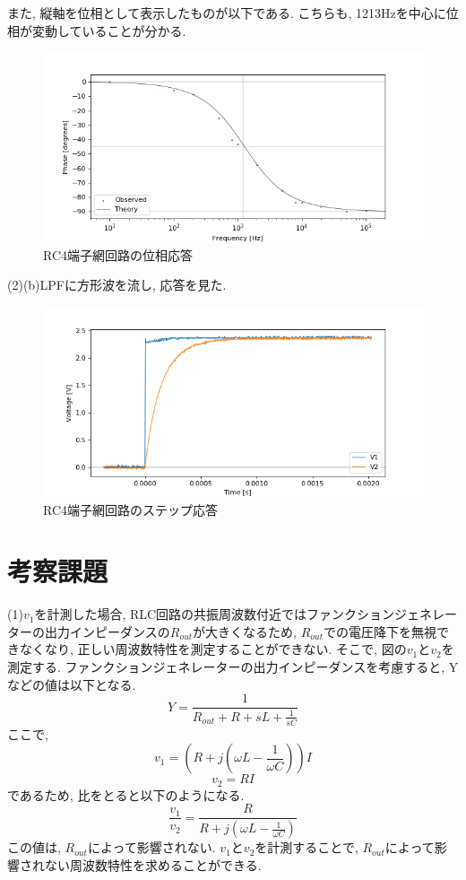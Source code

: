 \documentclass[a4j,dvipdfmx]{article}
\begin{document}
また, 縦軸を位相として表示したものが以下である. こちらも, 1213Hzを中心に位相が変動していることが分かる. 


\begin{figure}[H]
    \begin{center}
     	\includegraphics[width=12cm]{figures/four_terminal_RC_phase.png}
        \caption{RC4端子網回路の位相応答}
    \end{center}
\end{figure}

(2)(b)LPFに方形波を流し, 応答を見た. 
\begin{figure}[H]
    \begin{center}
     	\includegraphics[width=12cm]{figures/2b.png}
        \caption{RC4端子網回路のステップ応答}
    \end{center}
\end{figure}

\section{考察課題}
(1)$v_1$を計測した場合, RLC回路の共振周波数付近ではファンクションジェネレーターの出力インピーダンスの$R_{out}$が大きくなるため, $R_{out}$での電圧降下を無視できなくなり, 正しい周波数特性を測定することができない. そこで, 図の$v_1$と$v_2$を測定する. ファンクションジェネレーターの出力インピーダンスを考慮すると, Yなどの値は以下となる. 
$$
Y=\frac{1}{R_{out} + R + sL + \frac{1}{sC}}
$$
ここで, 
$$
v_1 = \left(R+j(\omega L-\frac{1}{\omega C})\right)I
$$
$$
v_2 = RI
$$
であるため, 比をとると以下のようになる. 
$$
\frac{v_1}{v_2} = \frac{R}{R+j(\omega L-\frac{1}{\omega C})}
$$
この値は, $R_{out}$によって影響されない. $v_1$と$v_2$を計測することで, $R_{out}$によって影響されない周波数特性を求めることができる. \\
\end{document}
